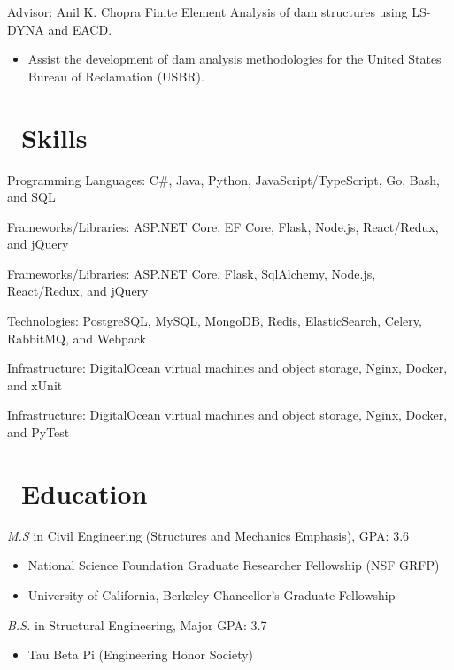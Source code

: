 \documentclass{resume}
\begin{document}
 {Advisor: Anil K. Chopra}
Finite Element Analysis of dam structures using LS-DYNA and EACD.
\begin{itemize}
  \item Assist the development of dam analysis methodologies for the United States Bureau of
          Reclamation (USBR).
\end{itemize}


\section{\faCogs\ Skills}

  Programming Languages: C\#, Java, Python, JavaScript/TypeScript, Go, Bash, and SQL

  Frameworks/Libraries: ASP.NET Core, EF Core, Flask, Node.js, React/Redux, and jQuery
  
  Frameworks/Libraries: ASP.NET Core, Flask, SqlAlchemy, Node.js, React/Redux, and jQuery

  Technologies: PostgreSQL, MySQL, MongoDB, Redis, ElasticSearch, Celery, RabbitMQ, and Webpack
  
  Infrastructure: DigitalOcean virtual machines and object storage, Nginx, Docker, and xUnit
  
  Infrastructure: DigitalOcean virtual machines and object storage, Nginx, Docker, and PyTest


\section{\faGraduationCap\ Education}
\textit{M.S } in Civil Engineering (Structures and Mechanics Emphasis), GPA: 3.6
\begin{itemize}
 \item National Science Foundation Graduate Researcher Fellowship (NSF GRFP)
 \item University of California, Berkeley Chancellor's Graduate Fellowship
\end{itemize}

\textit{B.S.} in Structural Engineering, Major GPA: 3.7
\begin{itemize}
    \item Tau Beta Pi (Engineering Honor Society)
\end{itemize}

%
%
\end{document}
